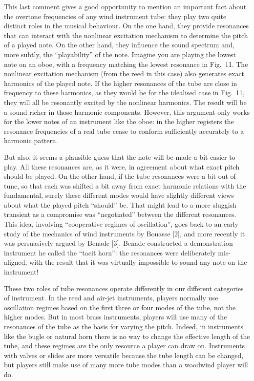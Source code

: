   This last comment gives a good opportunity to mention an important fact about 
  the overtone frequencies of any wind instrument tube: they play two quite 
  distinct roles in the musical behaviour. On the one hand, they provide 
  resonances that can interact with the nonlinear excitation mechanism to 
  determine the pitch of a played note. On the other hand, they influence the 
  sound spectrum and, more subtly, the “playability” of the note. Imagine you 
  are playing the lowest note on an oboe, with a frequency matching the lowest 
  resonance in Fig.\ 11. The nonlinear excitation mechanism (from the reed in 
  this case) also generates exact harmonics of the played note. If the higher 
  resonances of the tube are close in frequency to these harmonics, as they 
  would be for the idealised case in Fig.\ 11, they will all be resonantly 
  excited by the nonlinear harmonics. The result will be a sound richer in 
  those harmonic components. However, this argument only works for the lower 
  notes of an instrument like the oboe: in the higher registers the resonance 
  frequencies of a real tube cease to conform sufficiently accurately to a 
  harmonic pattern. 

  But also, it seems a plausible guess that the note will be made a bit easier 
  to play. All these resonances are, as it were, in agreement about what exact 
  pitch should be played. On the other hand, if the tube resonances were a bit 
  out of tune, so that each was shifted a bit away from exact harmonic 
  relations with the fundamental, surely these different modes would have 
  slightly different views about what the played pitch “should” be. That might 
  lead to a more sluggish transient as a compromise was “negotiated” between 
  the different resonances. This idea, involving “cooperative regimes of 
  oscillation”, goes back to an early study of the mechanics of wind 
  instruments by Bouasse [2], and more recently it was persuasively argued by 
  Benade [3]. Benade constructed a demonstration instrument he called the 
  “tacit horn”: the resonances were deliberately mis-aligned, with the result 
  that it was virtually impossible to sound any note on the instrument! 

  These two roles of tube resonances operate differently in our different 
  categories of instrument. In the reed and air-jet instruments, players 
  normally use oscillation regimes based on the first three or four modes of 
  the tube, not the higher modes. But in most brass instruments, players will 
  use many of the resonances of the tube as the basis for varying the pitch. 
  Indeed, in instruments like the bugle or natural horn there is no way to 
  change the effective length of the tube, and these regimes are the only 
  resource a player can draw on. Instruments with valves or slides are more 
  versatile because the tube length can be changed, but players still make use 
  of many more tube modes than a woodwind player will do. 

